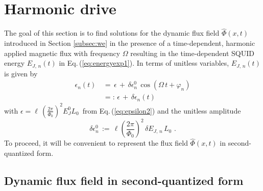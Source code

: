 
\section{Harmonic drive} \label{sec:hd}

\noindent
The goal of this section is to find solutions for the dynamic flux field $\hat{\Phi}(x,t)$ 
introduced in Section \ref{subsec:we} in the presence of a time-dependent, harmonic applied 
magnetic flux with frequency $\Omega$ resulting in the time-dependent SQUID energy $E_{J,\,n}(t)$ 
in Eq.\,(\ref{eq:energyexp1}). In terms of unitless variables, $E_{J,\,n}(t)$ is given by
%
\begin{equation} \label{eq:energyexp_alt}
\begin{split}
\epsilon_n(t) \, & = \, \epsilon \, + \, \delta \epsilon_n^0 \, \cos(\Omega \, t + \varphi_n) \\[2mm]
& =: \, \epsilon \, + \, \delta \epsilon_n(t) 
\end{split}
\end{equation}
%
with $\epsilon = \ell \, \displaystyle{\left(\frac{2 \pi}{\Phi_{0}}\right)^{2}} E_J^0 L_0\,$
from Eq.\,(\ref{eq:epsilon2}) and the unitless amplitude 
%
\begin{equation} \label{eq:deltaepsilon_alt}
    \delta \epsilon_n^0 \, := \, \ell \left(\frac{2 \pi}{\Phi_{0}}\right)^{2} \,
\delta E_{J,\,n} \, L_0 \, \, .
\end{equation}
%
To proceed, it will be convenient to represent the flux field $\hat{\Phi}(x,t)$
in second-quantized form.


\newpage

\subsection{Dynamic flux field in second-quantized form}
\label{subsec:sq}

